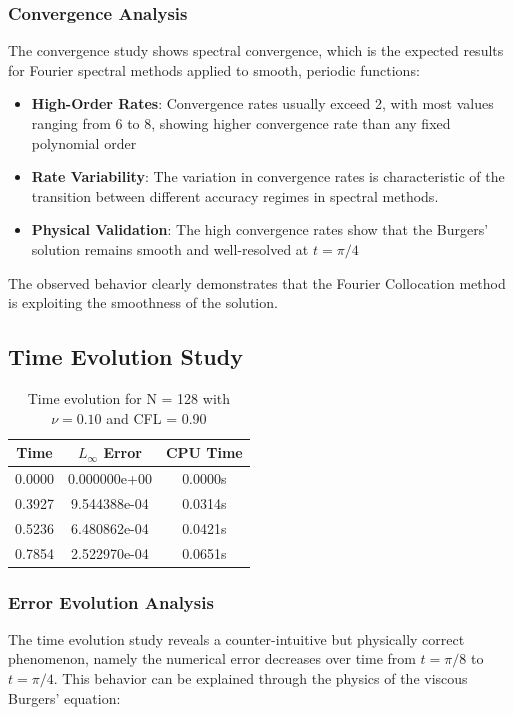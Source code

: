 \subsubsection{Convergence Analysis}
The convergence study shows spectral convergence, which is the expected results for Fourier spectral methods applied to smooth, periodic functions:
%
\begin{itemize}
	\item \textbf{High-Order Rates}: Convergence rates usually exceed 2, with most values ranging from 6 to 8, showing higher convergence rate than any fixed polynomial order
	\item \textbf{Rate Variability}: The variation in convergence rates is characteristic of the transition between different accuracy regimes in spectral methods.
	\item \textbf{Physical Validation}: The high convergence rates show that the Burgers' solution remains smooth and well-resolved at $t = \pi/4$
\end{itemize}
%
The observed behavior clearly demonstrates that the Fourier Collocation method is exploiting the smoothness of the solution.
\subsection{Time Evolution Study}
\begin{table}[H]
	\centering
	\begin{tabular}{|c|c|c|}
		\hline
		Time   & $L_\infty$ Error & CPU Time \\
		\hline
		0.0000 & 0.000000e+00     & 0.0000s  \\
		0.3927 & 9.544388e-04     & 0.0314s  \\
		0.5236 & 6.480862e-04     & 0.0421s  \\
		0.7854 & 2.522970e-04     & 0.0651s  \\
		\hline
	\end{tabular}
	\caption{Time evolution for N = 128 with $\nu = 0.10$ and CFL = 0.90}
	\label{tab:time_evolution}
\end{table}

\subsubsection{Error Evolution Analysis}
The time evolution study reveals a counter-intuitive but physically correct phenomenon, namely the numerical error decreases over time from $t = \pi/8$ to $t = \pi/4$. This behavior can be explained through the physics of the viscous Burgers' equation:

